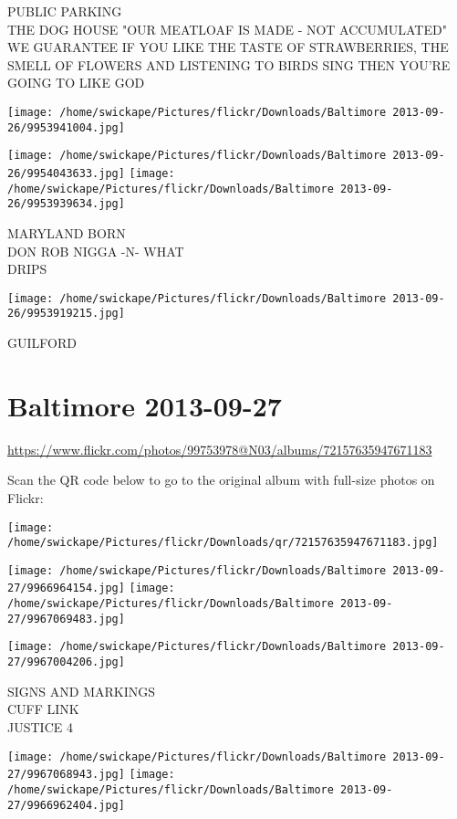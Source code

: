 \documentclass[10pt,letterpaper]{article}
\begin{document}
PUBLIC PARKING\\
THE DOG HOUSE "OUR MEATLOAF IS MADE {-} NOT ACCUMULATED"\\
WE GUARANTEE IF YOU LIKE THE TASTE OF STRAWBERRIES, THE SMELL OF FLOWERS AND LISTENING TO BIRDS SING THEN YOU'RE GOING TO LIKE GOD
\pagebreak

\texttt{[image: /home/swickape/Pictures/flickr/Downloads/Baltimore 2013-09-26/9953941004.jpg]}

\vspace{0.25in}
\texttt{[image: /home/swickape/Pictures/flickr/Downloads/Baltimore 2013-09-26/9954043633.jpg]}
\texttt{[image: /home/swickape/Pictures/flickr/Downloads/Baltimore 2013-09-26/9953939634.jpg]}

MARYLAND BORN\\
DON ROB NIGGA {-}N{-} WHAT\\
DRIPS
\pagebreak

\texttt{[image: /home/swickape/Pictures/flickr/Downloads/Baltimore 2013-09-26/9953919215.jpg]}

GUILFORD
\pagebreak

\section*{Baltimore 2013-09-27}

\url{https://www.flickr.com/photos/99753978@N03/albums/72157635947671183}

Scan the QR code below to go to the original album with full-size photos on Flickr:

\texttt{[image: /home/swickape/Pictures/flickr/Downloads/qr/72157635947671183.jpg]}
\pagebreak

\texttt{[image: /home/swickape/Pictures/flickr/Downloads/Baltimore 2013-09-27/9966964154.jpg]}
\texttt{[image: /home/swickape/Pictures/flickr/Downloads/Baltimore 2013-09-27/9967069483.jpg]}

\vspace{0.25in}
\texttt{[image: /home/swickape/Pictures/flickr/Downloads/Baltimore 2013-09-27/9967004206.jpg]}

SIGNS AND MARKINGS\\
CUFF LINK\\
JUSTICE 4
\pagebreak

\texttt{[image: /home/swickape/Pictures/flickr/Downloads/Baltimore 2013-09-27/9967068943.jpg]}
\texttt{[image: /home/swickape/Pictures/flickr/Downloads/Baltimore 2013-09-27/9966962404.jpg]}
\end{document}
